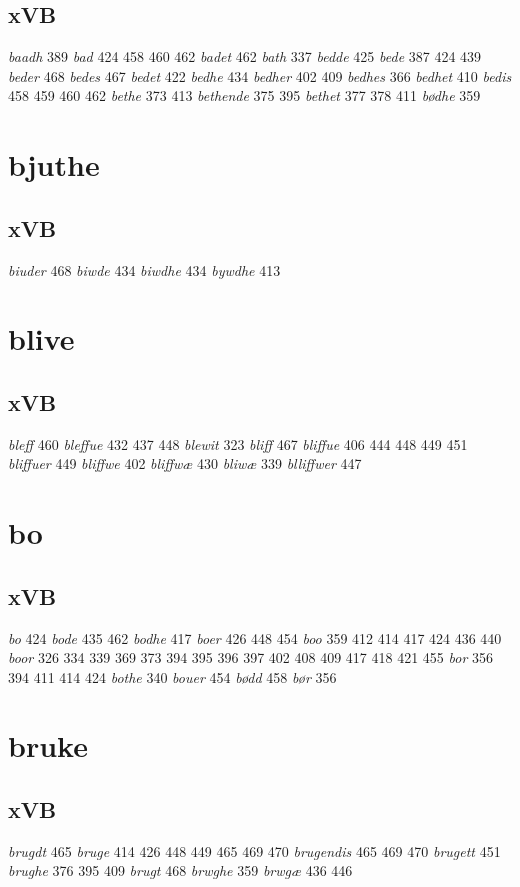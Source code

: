 \documentclass[a4paper,twocolumn]{article}
\begin{document}
\subsection{xVB}
\label{sec:org5aecad0}
\emph{baadh} 389 \emph{bad} 424 458 460 462 \emph{badet} 462 \emph{bath} 337 \emph{bedde} 425 \emph{bede} 387 424 439 \emph{beder} 468 \emph{bedes} 467 \emph{bedet} 422 \emph{bedhe} 434 \emph{bedher} 402 409 \emph{bedhes} 366 \emph{bedhet} 410 \emph{bedis} 458 459 460 462 \emph{bethe} 373 413 \emph{bethende} 375 395 \emph{bethet} 377 378 411 \emph{bødhe} 359 
\section{bjuthe}
\label{sec:org86e7dcd}
\subsection{xVB}
\label{sec:org589594b}
\emph{biuder} 468 \emph{biwde} 434 \emph{biwdhe} 434 \emph{bywdhe} 413 
\section{blive}
\label{sec:orgef9217d}
\subsection{xVB}
\label{sec:orgef06799}
\emph{bleff} 460 \emph{bleffue} 432 437 448 \emph{blewit} 323 \emph{bliff} 467 \emph{bliffue} 406 444 448 449 451 \emph{bliffuer} 449 \emph{bliffwe} 402 \emph{bliffwæ} 430 \emph{bliwæ} 339 \emph{blliffwer} 447 
\section{bo}
\label{sec:orge13d23b}
\subsection{xVB}
\label{sec:org2298c73}
\emph{bo} 424 \emph{bode} 435 462 \emph{bodhe} 417 \emph{boer} 426 448 454 \emph{boo} 359 412 414 417 424 436 440 \emph{boor} 326 334 339 369 373 394 395 396 397 402 408 409 417 418 421 455 \emph{bor} 356 394 411 414 424 \emph{bothe} 340 \emph{bouer} 454 \emph{bødd} 458 \emph{bør} 356 
\section{bruke}
\label{sec:orgeb462a1}
\subsection{xVB}
\label{sec:org071544f}
\emph{brugdt} 465 \emph{bruge} 414 426 448 449 465 469 470 \emph{brugendis} 465 469 470 \emph{brugett} 451 \emph{brughe} 376 395 409 \emph{brugt} 468 \emph{brwghe} 359 \emph{brwgæ} 436 446 
\end{document}

